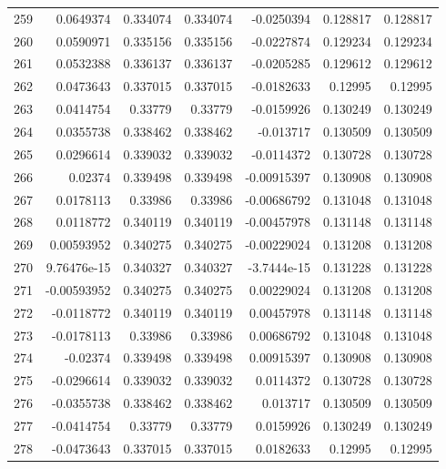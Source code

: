 \begin{tabular}{rrrrrrr}
 259 &  0.0649374   & 0.334074    & 0.334074    & -0.0250394   & 0.128817    & 0.128817    \\
 260 &  0.0590971   & 0.335156    & 0.335156    & -0.0227874   & 0.129234    & 0.129234    \\
 261 &  0.0532388   & 0.336137    & 0.336137    & -0.0205285   & 0.129612    & 0.129612    \\
 262 &  0.0473643   & 0.337015    & 0.337015    & -0.0182633   & 0.12995     & 0.12995     \\
 263 &  0.0414754   & 0.33779     & 0.33779     & -0.0159926   & 0.130249    & 0.130249    \\
 264 &  0.0355738   & 0.338462    & 0.338462    & -0.013717    & 0.130509    & 0.130509    \\
 265 &  0.0296614   & 0.339032    & 0.339032    & -0.0114372   & 0.130728    & 0.130728    \\
 266 &  0.02374     & 0.339498    & 0.339498    & -0.00915397  & 0.130908    & 0.130908    \\
 267 &  0.0178113   & 0.33986     & 0.33986     & -0.00686792  & 0.131048    & 0.131048    \\
 268 &  0.0118772   & 0.340119    & 0.340119    & -0.00457978  & 0.131148    & 0.131148    \\
 269 &  0.00593952  & 0.340275    & 0.340275    & -0.00229024  & 0.131208    & 0.131208    \\
 270 &  9.76476e-15 & 0.340327    & 0.340327    & -3.7444e-15  & 0.131228    & 0.131228    \\
 271 & -0.00593952  & 0.340275    & 0.340275    &  0.00229024  & 0.131208    & 0.131208    \\
 272 & -0.0118772   & 0.340119    & 0.340119    &  0.00457978  & 0.131148    & 0.131148    \\
 273 & -0.0178113   & 0.33986     & 0.33986     &  0.00686792  & 0.131048    & 0.131048    \\
 274 & -0.02374     & 0.339498    & 0.339498    &  0.00915397  & 0.130908    & 0.130908    \\
 275 & -0.0296614   & 0.339032    & 0.339032    &  0.0114372   & 0.130728    & 0.130728    \\
 276 & -0.0355738   & 0.338462    & 0.338462    &  0.013717    & 0.130509    & 0.130509    \\
 277 & -0.0414754   & 0.33779     & 0.33779     &  0.0159926   & 0.130249    & 0.130249    \\
 278 & -0.0473643   & 0.337015    & 0.337015    &  0.0182633   & 0.12995     & 0.12995     \\

\end{tabular}
